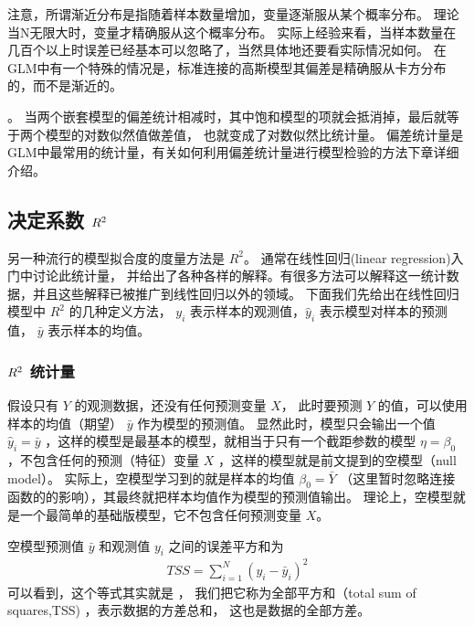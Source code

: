 \documentclass[letterpaper,10pt,english]{sphinxmanual}
\begin{document}
注意，所谓渐近分布是指随着样本数量增加，变量逐渐服从某个概率分布。
理论当N无限大时，变量才精确服从这个概率分布。
实际上经验来看，当样本数量在几百个以上时误差已经基本可以忽略了，当然具体地还要看实际情况如何。
在GLM中有一个特殊的情况是，标准连接的高斯模型其偏差是精确服从卡方分布的，而不是渐近的。

。
当两个嵌套模型的偏差统计相减时，其中饱和模型的项就会抵消掉，最后就等于两个模型的对数似然值做差值，
也就变成了对数似然比统计量。
偏差统计量是GLM中最常用的统计量，有关如何利用偏差统计量进行模型检验的方法下章详细介绍。


\subsection{决定系数 \protect\(R^2\protect\)}
\label{\detokenize{_u6a21_u578b_u8bc4_u4f30/content:r-2}}
另一种流行的模型拟合度的度量方法是 \(R^2\)。
通常在线性回归(linear regression)入门中讨论此统计量，
并给出了各种各样的解释。有很多方法可以解释这一统计数据，并且这些解释已被推广到线性回归以外的领域。
下面我们先给出在线性回归模型中 \(R^2\) 的几种定义方法，
\(y_i\) 表示样本的观测值，\(\hat{y}_i\) 表示模型对样本的预测值，
\(\bar{y}\) 表示样本的均值。


\subsubsection{\protect\(R^2\protect\) 统计量}
\label{\detokenize{_u6a21_u578b_u8bc4_u4f30/content:id4}}
假设只有 \(Y\) 的观测数据，还没有任何预测变量 \(X\)，
此时要预测 \(Y\) 的值，可以使用样本的均值（期望） \(\bar{y}\)
作为模型的预测值。
显然此时，模型只会输出一个值 \(\hat{y}_i = \bar{y}\)
，这样的模型是最基本的模型，就相当于只有一个截距参数的模型 \(\eta=\beta_0\)
，不包含任何的预测（特征）变量 \(X\)
，这样的模型就是前文提到的空模型（null model）。
实际上，空模型学习到的就是样本的均值 \(\beta_0 = \bar{Y}\)
（这里暂时忽略连接函数的的影响），其最终就把样本均值作为模型的预测值输出。
理论上，空模型就是一个最简单的基础版模型，它不包含任何预测变量 \(X\)。

空模型预测值 \(\bar{y}\) 和观测值 \(y_i\) 之间的误差平方和为
\begin{equation}\label{equation:模型评估/content:模型评估/content:15}
\begin{split}TSS = \sum_{i=1}^N(y_i -\bar{y}_i)^2\end{split}
\end{equation}
可以看到，这个等式其实就是 ，
我们把它称为全部平方和（total sum of squares,TSS)
，表示数据的方差总和，
这也是数据的全部方差。
\end{document}
